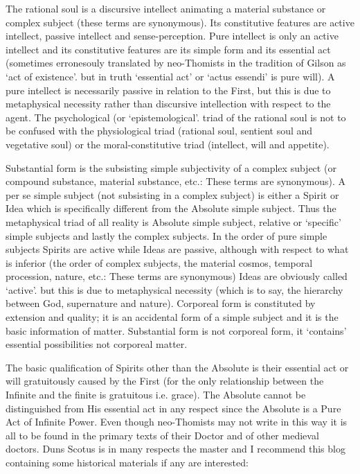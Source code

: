 \begin{footnotesize}
\begin{sffamily}
The rational soul is a discursive intellect animating a material substance or complex subject (these terms are synonymous). Its constitutive features are active intellect, passive intellect and sense-perception. Pure intellect is only an active intellect and its constitutive features are its simple form and its essential act (sometimes erronesouly translated by neo-Thomists in the tradition of Gilson as `act of existence'. but in truth `essential act' or `actus essendi' is pure will). A pure intellect is necessarily passive in relation to the First, but this is due to metaphysical necessity rather than discursive intellection with respect to the agent. The psychological (or `epistemological'. triad of the rational soul is not to be confused with the physiological triad (rational soul, sentient soul and vegetative soul) or the moral-constitutive triad (intellect, will and appetite).

Substantial form is the subsisting simple subjectivity of a complex subject (or compound substance, material substance, etc.: These terms are synonymous). A per se simple subject (not subsisting in a complex subject) is either a Spirit or Idea which is specifically different from the Absolute simple subject. Thus the metaphysical triad of all reality is Absolute simple subject, relative or `specific' simple subjects and lastly the complex subjects. In the order of pure simple subjects Spirits are active while Ideas are passive, although with respect to what is inferior (the order of complex subjects, the material cosmos, temporal procession, nature, etc.: These terms are synonymous) Ideas are obviously called `active'. but this is due to metaphysical necessity (which is to say, the hierarchy between God, supernature and nature). Corporeal form is constituted by extension and quality; it is an accidental form of a simple subject and it is the basic information of matter. Substantial form is not corporeal form, it `contains' essential possibilities not corporeal matter.

The basic qualification of Spirits other than the Absolute is their essential act or will gratuitously caused by the First (for the only relationship between the Infinite and the finite is gratuitous i.e. grace). The Absolute cannot be distinguished from His essential act in any respect since the Absolute is a Pure Act of Infinite Power. Even though neo-Thomists may not write in this way it is all to be found in the primary texts of their Doctor and of other medieval doctors. Duns Scotus is in many respects the master and I recommend this blog containing some historical materials if any are interested:


\end{sffamily}
\end{footnotesize}
